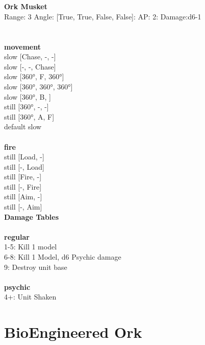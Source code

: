 \ \\

\ \\
{\bf Ork Musket } \\



Range: 3  Angle: [True, True, False, False]: AP: 2: Damage:d6-1 \\




 
\ \\



\ \\ {\bf movement } \\
slow [Chase, -, -] \\
slow [-, -, Chase] \\
slow [360°, F, 360°] \\
slow [360°, 360°, 360°] \\
slow [360°, B, ] \\
still [360°, -, -] \\
still [360°, A, F] \\
default slow \\
\ \\ {\bf fire } \\
still [Load, -] \\
still [-, Load] \\
still [Fire, -] \\
still [-, Fire] \\
still [Aim, -] \\
still [-, Aim] \\


{\bf Damage Tables} \\
\ \\ {\bf regular } \\
1-5: Kill 1 model \\
6-8: Kill 1 Model, d6 Psychic damage \\
9: Destroy unit base \\
\ \\ {\bf psychic } \\
4+: Unit Shaken \\










\pagebreak\pagebreak

\section{ BioEngineered Ork }

